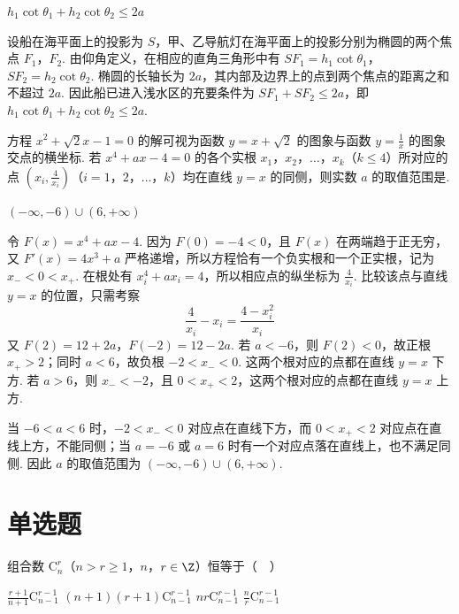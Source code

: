 \begin{answer}
\(h_1\cot\theta_1+h_2\cot\theta_2\leqslant 2a\)
\end{answer}

\begin{solution}
设船在海平面上的投影为 \(S\)，甲、乙导航灯在海平面上的投影分别为椭圆的两个焦点 \(F_1\)，\(F_2\). 由仰角定义，在相应的直角三角形中有 \(SF_1=h_1\cot\theta_1\)，\(SF_2=h_2\cot\theta_2\). 椭圆的长轴长为 \(2a\)，其内部及边界上的点到两个焦点的距离之和不超过 \(2a\). 因此船已进入浅水区的充要条件为 \(SF_1+SF_2\leqslant2a\)，即 \(h_1\cot\theta_1+h_2\cot\theta_2\leqslant2a\).
\end{solution}

\begin{problem}
方程 \(x^{2} + \sqrt{2} x - 1 = 0\) 的解可视为函数 \(y = x + \sqrt{2}\) 的图象与函数 \(y = \frac{1}{x}\) 的图象交点的横坐标. 若 \(x^{4} + ax - 4 = 0\) 的各个实根 \(x_{1}\)，\(x_{2}\)，\(\dots\)，\(x_{k}\)（\(k \leqslant 4\)）所对应的点 \(\left(x_{i}, \frac{4}{x_{i}}\right)\)（\(i=1\)，\(2\)，\(\dots\)，\(k\)）均在直线 \(y = x\) 的同侧，则实数 \(a\) 的取值范围是\fillinblank{}.
\end{problem}

\begin{answer}
\((- \infty,-6)\cup(6,+\infty)\)
\end{answer}

\begin{solution}
令 \(F(x)=x^4+ax-4\). 因为 \(F(0)=-4<0\)，且 \(F(x)\) 在两端趋于正无穷，又 \(F'(x)=4x^3+a\) 严格递增，所以方程恰有一个负实根和一个正实根，记为 \(x_-<0<x_+\). 在根处有 \(x_i^4+ax_i=4\)，所以相应点的纵坐标为 \(\frac{4}{x_i}\). 比较该点与直线 \(y=x\) 的位置，只需考察
\[
\frac4{x_i}-x_i=\frac{4-x_i^2}{x_i}
\]
又 \(F(2)=12+2a\)，\(F(-2)=12-2a\). 若 \(a<-6\)，则 \(F(2)<0\)，故正根 \(x_+>2\)；同时 \(a<6\)，故负根 \(-2<x_-<0\). 这两个根对应的点都在直线 \(y=x\) 下方. 若 \(a>6\)，则 \(x_-<-2\)，且 \(0<x_+<2\)，这两个根对应的点都在直线 \(y=x\) 上方.

当 \(-6<a<6\) 时，\(-2<x_-<0\) 对应点在直线下方，而 \(0<x_+<2\) 对应点在直线上方，不能同侧；当 \(a=-6\) 或 \(a=6\) 时有一个对应点落在直线上，也不满足同侧. 因此 \(a\) 的取值范围为 \((-\infty,-6)\cup(6,+\infty)\).
\end{solution}

\section{单选题}

\begin{problem}
组合数 \(\mathrm C_n^r\)（\(n > r\geqslant 1\)，\(n\)，\(r\in \Z\)）恒等于（\(\quad\)）

\choices
    {\(\frac{r + 1}{n + 1} \mathrm C_{n - 1}^{r - 1}\)}
    {\((n + 1)(r + 1)\mathrm C_{n - 1}^{r - 1}\)}
    {\(nr\mathrm C_{n - 1}^{r - 1}\)}
    {\(\frac{n}{r} \mathrm C_{n - 1}^{r - 1}\)}
\end{problem}

